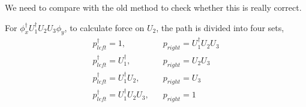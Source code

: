 \begin{tcolorbox}
We need to compare with the old method to check whether this is really correct.

For $\phi _x^{\dagger} U_1^{\dagger}U_2U_3\phi _y$, to calculate force on $U_2$, the path is divided into four sets,
\begin{equation}
\begin{split}
p^{\dagger}_{left}=1,\;\;\;&p_{right}=U_1^{\dagger}U_2U_3\\
p^{\dagger}_{left}=U_1^{\dagger},\;\;\;&p_{right}=U_2U_3\\
p^{\dagger}_{left}=U_1^{\dagger}U_2,\;\;\;&p_{right}=U_3\\
p^{\dagger}_{left}=U_1^{\dagger}U_2U_3,\;\;\;&p_{right}=1\\
\end{split}
\end{equation}


\end{tcolorbox}
